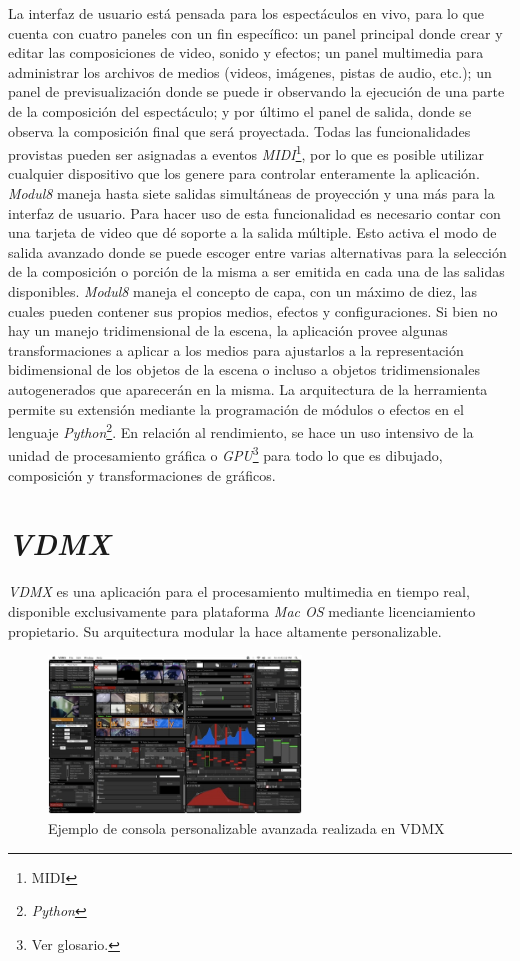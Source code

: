 La interfaz de usuario está pensada para los espectáculos en vivo, para lo que cuenta con cuatro paneles con un fin específico: un panel principal donde crear y editar las composiciones de video, sonido y efectos; un panel multimedia para administrar los archivos de medios (videos, imágenes, pistas de audio, etc.); un panel de previsualización donde se puede ir observando la ejecución de una parte de la composición del espectáculo; y por último el panel de salida, donde se observa la composición final que será proyectada. Todas las funcionalidades provistas pueden ser asignadas a eventos \emph{MIDI}\footnote{MIDI}, por lo que es posible utilizar cualquier dispositivo que los genere para controlar enteramente la aplicación.
\emph{Modul8} maneja hasta siete salidas simultáneas de proyección y una más para la interfaz de usuario. Para hacer uso de esta funcionalidad es necesario contar con una tarjeta de video que dé soporte a la salida múltiple. Esto activa el modo de salida avanzado donde se puede escoger entre varias alternativas para la selección de la composición o porción de la misma a ser emitida en cada una de las salidas disponibles. \emph{Modul8} maneja el concepto de capa, con un máximo de diez, las cuales pueden contener sus propios medios, efectos y configuraciones.
Si bien no hay un manejo tridimensional de la escena, la aplicación provee algunas transformaciones a aplicar a los medios para ajustarlos a la representación bidimensional de los objetos de la escena o incluso a objetos tridimensionales autogenerados que aparecerán en la misma.
La arquitectura de la herramienta permite su extensión mediante la programación de módulos o efectos en el lenguaje \emph{Python}\footnote{\emph{Python}}.
En relación al rendimiento, se hace un uso intensivo de la unidad de procesamiento gráfica o \emph{GPU}\footnote{Ver glosario.} para todo lo que es dibujado, composición y transformaciones de gráficos.

\section{\emph{VDMX}}
\emph{VDMX}\cite{VDMX} es una aplicación para el procesamiento multimedia en tiempo real, disponible exclusivamente para plataforma \emph{Mac OS} mediante licenciamiento propietario. Su arquitectura modular la hace altamente personalizable.

\begin{figure}[H]
  \centering
    \includegraphics[width=0.6\textwidth]{./Cap3_aplicaciones/apps-vdmx.png}
  \caption{Ejemplo de consola personalizable avanzada realizada en VDMX}
  \label{fig:Apps-VDMX}
\end{figure}

